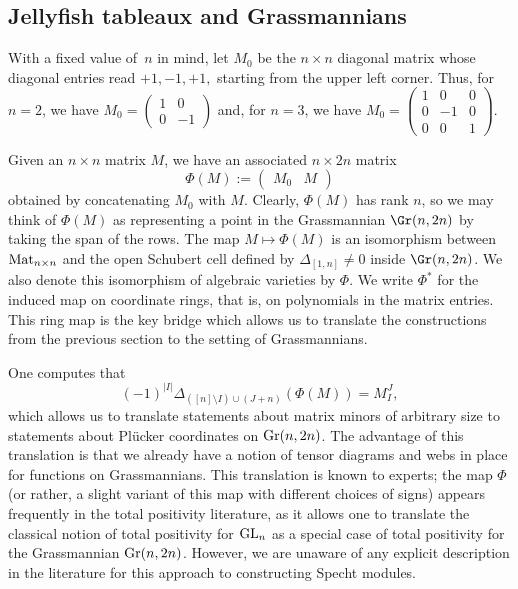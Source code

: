 \subsection{Jellyfish tableaux and Grassmannians}\label{sec:jellyfish_on_Gr}
With a fixed value of~$n$ in mind, let 
$M_0$ be the $n \times n$ diagonal matrix whose diagonal entries read $+1,-1,+1,$ starting from the upper left corner. Thus, for $n=2$, we have $M_0 = \begin{pmatrix}
1 & 0 \\ 0 & -1
\end{pmatrix}$
and, for $n=3$, we have
$M_0 = \begin{pmatrix}
1 &  0 & 0 \\ 0 & -1 & 0 \\ 0 & 0 & 1
\end{pmatrix}$.

 
Given an $n \times n$ matrix $M$, we have an associated $n \times 2n $ matrix 
\begin{equation}\label{eq:Phi}
\Phi(M) := \begin{pmatrix}
M_0 & {M} 
\end{pmatrix}
\end{equation}
obtained by concatenating $M_0$ with $M$.
Clearly, $\Phi(M)$ has rank $n$, so we may think of $\Phi(M)$ as representing a point in the Grassmannian $\Gr(n,2n)$ by taking the span of the rows. The map $M \mapsto \Phi(M)$ is an isomorphism between ${\rm Mat}_{n \times n}$ and the open Schubert cell defined by $\Delta_{[1,n]} \neq 0$ inside 
$\Gr(n,2n)$. We also denote this isomorphism of algebraic varieties by $\Phi$. We write $\Phi^*$ for the induced map on coordinate rings, that is, on polynomials in the matrix entries. This ring map is the key bridge which allows us to translate the constructions from the previous section to the setting of Grassmannians.

 
One computes that
\begin{equation}\label{eq:PlutoMinor}
(-1)^{|I|}\Delta_{([n]\setminus I) \cup (J+n)}(\Phi(M)) = M_I^J,
\end{equation}
which allows us to translate statements about matrix minors of arbitrary size to statements about Pl\"ucker coordinates on ${\rm Gr}(n,2n)$. The advantage of this translation is that we already have a notion of tensor diagrams and webs in place for functions on Grassmannians. This translation is known to experts; the map $\Phi$ (or rather, a slight variant of this map with different choices of signs) appears frequently in the total positivity literature, as it allows one to translate the classical notion of total positivity for ${\rm GL}_n$ as a special case of total positivity for the Grassmannian ${\rm Gr}(n,2n)$. However, we are unaware of any explicit description in the literature for this approach to constructing Specht modules.


